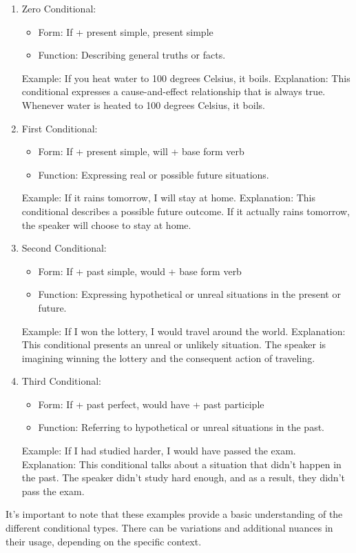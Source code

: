 \documentclass{article}
\begin{document}
\begin{enumerate}
    \item Zero Conditional:
    \begin{itemize}
        \item Form: If + present simple, present simple
        \item Function: Describing general truths or facts.
    \end{itemize}
    Example: If you heat water to 100 degrees Celsius, it boils.
    Explanation: This conditional expresses a cause-and-effect relationship that is always true. Whenever water is heated to 100 degrees Celsius, it boils.
    \item First Conditional:
    \begin{itemize}
        \item Form: If + present simple, will + base form verb
        \item Function: Expressing real or possible future situations.
    \end{itemize}
    Example: If it rains tomorrow, I will stay at home.
    Explanation: This conditional describes a possible future outcome. If it actually rains tomorrow, the speaker will choose to stay at home.
    \item Second Conditional:
    \begin{itemize}
        \item Form: If + past simple, would + base form verb
        \item Function: Expressing hypothetical or unreal situations in the present or future.
    \end{itemize}
    Example: If I won the lottery, I would travel around the world.
    Explanation: This conditional presents an unreal or unlikely situation. The speaker is imagining winning the lottery and the consequent action of traveling.
    \item Third Conditional:
    \begin{itemize}
        \item Form: If + past perfect, would have + past participle
        \item Function: Referring to hypothetical or unreal situations in the past.
    \end{itemize}
    Example: If I had studied harder, I would have passed the exam.
    Explanation: This conditional talks about a situation that didn't happen in the past. The speaker didn't study hard enough, and as a result, they didn't pass the exam.
\end{enumerate}
It's important to note that these examples provide a basic understanding of the different conditional types. There can be variations and additional nuances in their usage, depending on the specific context.
\end{document}
